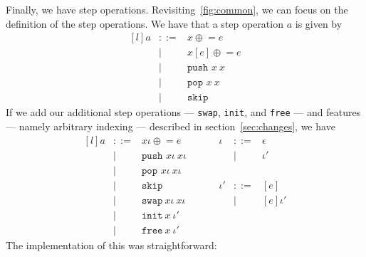 Finally, we have step operations. Revisiting~\ref{fig:common}, we can focus on the definition of the step operations. We have that a step operation $a$ is given by
\[
\begin{matrix*}[l]
  {a} & ::= & {x}\mathrel{\oplus}= e \\
             &  |  & {x}[ e]\mathrel{\oplus}= e \\
             &  |  & \texttt{push }{x}\ {x} \\
             &  |  & \texttt{pop  }{x}\ {x} \\
             &  |  & \texttt{skip}
\end{matrix*}
\]
If we add our additional step operations --- \texttt{swap}, \texttt{init}, and \texttt{free} --- and features --- namely arbitrary indexing --- described in section~\ref{sec:changes}, we have
\[
\begin{matrix*}[l]
  {a} & ::= & {x}\iota\mathrel{\oplus}= e       \quad\quad\quad  & \iota  & ::= & \epsilon \\
      &  |  & \texttt{push }{x}\iota \ {x}\iota                   &        & |   & \iota' \\
      &  |  & \texttt{pop  }{x}\iota \ {x}\iota \\
      &  |  & \texttt{skip}                                      & \iota' & ::= & [e] \\
      &  |  & \texttt{swap} \ x\iota \ x\iota                    &        & |   & [e]\iota' \\
      &  |  & \texttt{init} \ x \ \iota' \\
      &  |  & \texttt{free} \ x \ \iota'
\end{matrix*}
\]
The implementation of this was straightforward:


